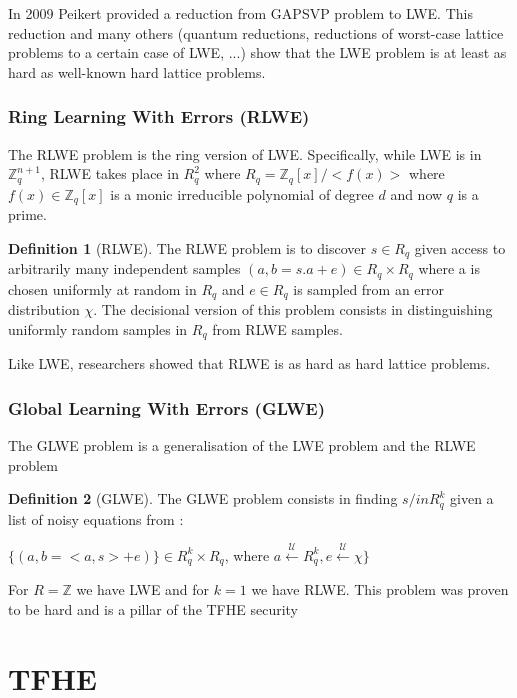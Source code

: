 \documentclass{article}
\newcommand{\Z}{\mathbb{Z}}
\newcommand{\Sunif}{\xleftarrow{\mathcal{U}}}
\theoremstyle{definition}
\newtheorem{definition}{Definition}[section]
\theoremstyle{Theorem}
\begin{document}
In 2009 Peikert provided a reduction from GAPSVP problem to LWE. This reduction and many others (quantum reductions, reductions of worst-case lattice problems to a certain case of LWE, ...) show that the LWE problem is at least as hard as well-known hard lattice problems. 



\subsubsection{Ring Learning With Errors (RLWE)}\label{RLWE}

The RLWE problem is the ring version of LWE. Specifically, while LWE is in $\Z_q^{n+1}$, RLWE takes place in $R_q^2$ where $R_q = \Z_q[x]/<f(x)>$ where $f(x)\in\Z_q[x]$ is a monic irreducible polynomial of degree $d$ and now $q$ is a prime. 

\begin{definition}[RLWE]

The RLWE problem is to discover $s\in R_q$ given access to arbitrarily many independent samples $(a,b=s.a+e)\in R_q\times R_q$ where a is chosen uniformly at random in $R_q$ and $e\in R_q$ is sampled from an error distribution $\chi$.
The decisional version of this problem consists in distinguishing uniformly random samples in $R_q$ from RLWE samples. 

\end{definition}

Like LWE, researchers showed that RLWE is as hard as hard lattice problems. 

\subsubsection{Global Learning With Errors (GLWE)}\label{GLWE}

The GLWE problem is a generalisation of the LWE problem and the RLWE problem

\begin{definition}[GLWE]
The GLWE problem consists in finding $s /in R_q^k$ given a list of noisy equations from : 

$\{(a, b = <a, s> + e)\}\in R_q^k \times R_q$, where $a \Sunif R_q^k, e\Sunif \chi\}$
\end{definition}
For $R = \Z$ we have LWE and for $k=1$ we have RLWE. 
This problem was proven to be hard and is a pillar of the TFHE security



\newpage
\section{TFHE}
\end{document}
